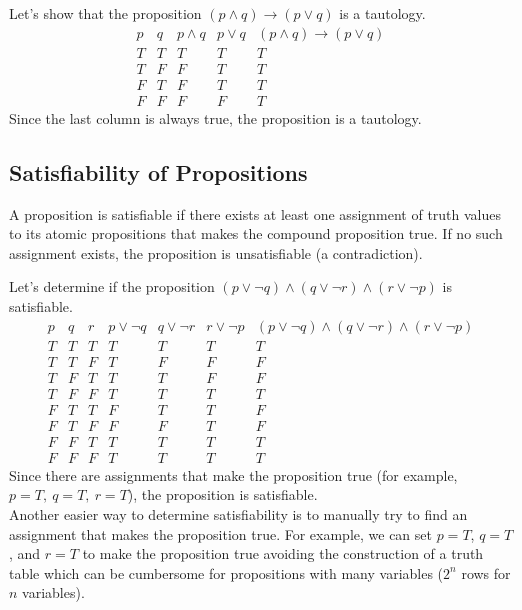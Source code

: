 \begin{eg}
    Let's show that the proposition $(p \land q) \to (p \lor q)$ is a tautology.
    \[
        \begin{array}{c|c|c|c|c}
            p & q & p \land q & p \lor q & (p \land q) \to (p \lor q) \\
            \hline
            T & T & T & T & T \\
            T & F & F & T & T \\
            F & T & F & T & T \\
            F & F & F & F & T
        \end{array}
    \]
    Since the last column is always true, the proposition is a tautology.
\end{eg}

\subsection{Satisfiability of Propositions}
\begin{definition}
    A proposition is satisfiable if there exists at least one assignment of truth values to its atomic propositions that makes the compound proposition true. If no such assignment exists, the proposition is unsatisfiable (a contradiction).
\end{definition}

\begin{eg}
    Let's determine if the proposition $(p \lor  \neg q) \land (q \lor \neg r) \land (r \lor \neg p)$ is satisfiable.
    \[
        \begin{array}{c|c|c|c|c|c|c}
            p & q & r & p \lor \neg q & q \lor \neg r & r \lor \neg p & (p \lor  \neg q) \land (q \lor \neg r) \land (r \lor \neg p) \\
            \hline
            T & T & T & T & T & T & T \\
            T & T & F & T & F & F & F \\
            T & F & T & T & T & F & F \\
            T & F & F & T & T & T & T \\
            F & T & T & F & T & T & F \\
            F & T & F & F & F & T & F \\
            F & F & T & T & T & T & T \\
            F & F & F & T & T & T & T
        \end{array}
    \]
    Since there are assignments that make the proposition true (for example, \(p = T, \ q = T, \ r = T\)), the proposition is satisfiable. \\
    Another easier way to determine satisfiability is to manually try to find an assignment that makes the proposition true. For example, we can set \(p = T\), \(q = T\), and \(r = T\) to make the proposition true avoiding the construction of a truth table which can be cumbersome for propositions with many variables ($2^n$ rows for \(n\) variables).
\end{eg}

